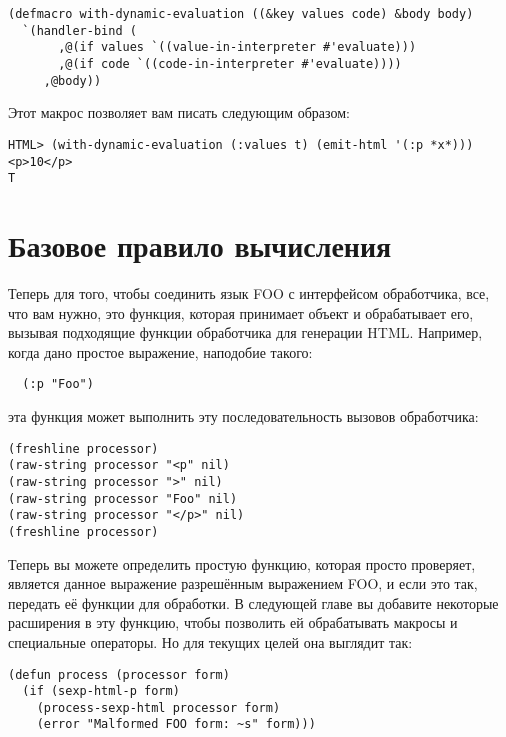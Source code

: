 \begin{lstlisting}
(defmacro with-dynamic-evaluation ((&key values code) &body body)
  `(handler-bind (
       ,@(if values `((value-in-interpreter #'evaluate)))
       ,@(if code `((code-in-interpreter #'evaluate))))
     ,@body))
\end{lstlisting}

Этот макрос позволяет вам писать следующим образом: 

\begin{lstlisting}
HTML> (with-dynamic-evaluation (:values t) (emit-html '(:p *x*)))
<p>10</p>
T
\end{lstlisting}


\section{Базовое правило вычисления}

Теперь для того, чтобы соединить язык FOO с интерфейсом обработчика, все, что вам нужно,
это функция, которая принимает объект и обрабатывает его, вызывая подходящие функции
обработчика для генерации HTML. Например, когда дано простое выражение, наподобие такого:

\begin{verbatim}
  (:p "Foo")
\end{verbatim}

эта функция может выполнить эту последовательность вызовов обработчика:

\begin{lstlisting}
(freshline processor)
(raw-string processor "<p" nil)
(raw-string processor ">" nil)
(raw-string processor "Foo" nil)
(raw-string processor "</p>" nil)
(freshline processor)
\end{lstlisting}

Теперь вы можете определить простую функцию, которая просто проверяет, является данное
выражение разрешённым выражением FOO, и если это так, передать её функции
 для обработки. В следующей главе вы добавите некоторые расширения
в эту функцию, чтобы позволить ей обрабатывать макросы и специальные операторы. Но для
текущих целей она выглядит так:

\begin{lstlisting}
(defun process (processor form)
  (if (sexp-html-p form)
    (process-sexp-html processor form)
    (error "Malformed FOO form: ~s" form)))
\end{lstlisting}

